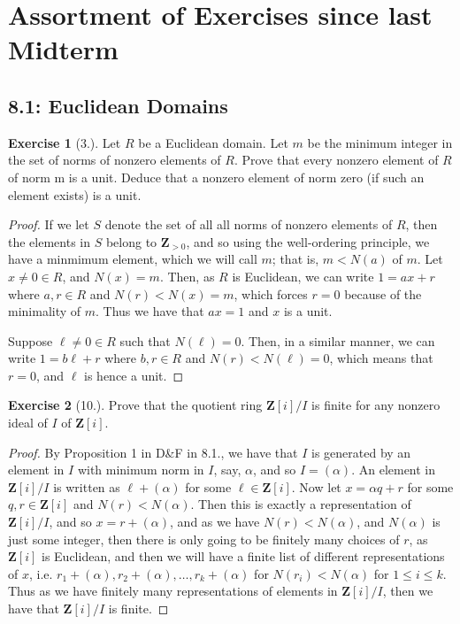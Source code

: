\documentclass[9pt,reqno]{amsart}
\theoremstyle{definition}
\newtheorem{exercise}{Exercise}[section]
\newcommand{\zz}{\mathbf Z}
\begin{document}
\section{Assortment of Exercises since last Midterm}
\subsection{8.1: Euclidean Domains}
\begin{exercise}[3.]
Let $R$ be a Euclidean domain. Let $m$ be the minimum integer in the set of norms of nonzero elements of $R$. Prove that every nonzero element of $R$ of norm m is a unit. Deduce that a nonzero element of norm zero (if such an element exists) is a unit.	
\end{exercise}
\begin{proof}
	If we let $S$ denote the set of all all norms of nonzero elements of $R$, then the elements in $S$ belong to $\zz_{> 0}$, and so using the well-ordering principle, we have a minmimum element, which we will call $m$; that is, $m< N(a)$ of $m$.  Let $x \neq 0 \in R$, and $N(x) = m$. Then, as $R$ is Euclidean, we can write $1 = ax + r$ where $a, r \in R$ and $N(r) < N(x) = m$, which forces $r = 0$ because of the minimality of $m$. Thus we have that $ax = 1$ and $x$ is a unit. 
	
	Suppose $\ell \neq 0 \in R$ such that $N(\ell ) = 0$.  Then, in a similar manner, we can write $1 = b \ell + r$ where $b, r \in R$ and $N(r) < N(\ell) = 0$, which means that $r = 0$, and $\ell $ is hence a unit. 
\end{proof}


\begin{exercise}[10.]
	Prove that the quotient ring $\zz[i]/I$ is finite for any nonzero ideal of $I$ of $\zz[i]$.
\end{exercise}
\begin{proof}
	By Proposition 1 in D\&F in 8.1., we have that $I$ is generated by an element in $I$ with  minimum norm in $I$, say, $\alpha$, and so $I= (\alpha)$. An element in $\zz[i]/ I$ is written as $\ell + (\alpha)$ for some $\ell  \in \zz[i]$. Now let $x = \alpha q + r$ for some $q, r \in \zz[i]$ and $N(r) < N(\alpha)$. Then this is exactly a representation of $\zz[i]/ I$, and so $x = r+ (\alpha)$, and as we have $N(r) < N(\alpha)$, and $N(\alpha)$ is just some integer, then there is only going to be finitely many choices of $r$, as $\zz[i]$ is Euclidean, and then we will have a finite list of different representations of $x$, i.e. $r_1 + (\alpha), r_2 + (\alpha), \ldots, r_k + (\alpha )$ for $N(r_i) < N(\alpha)$ for $1 \leq i \leq k$. Thus as we have finitely many representations of elements in $\zz[i]/I$, then we have that $\zz[i]/I$ is finite. 
\end{proof}
\end{document}
